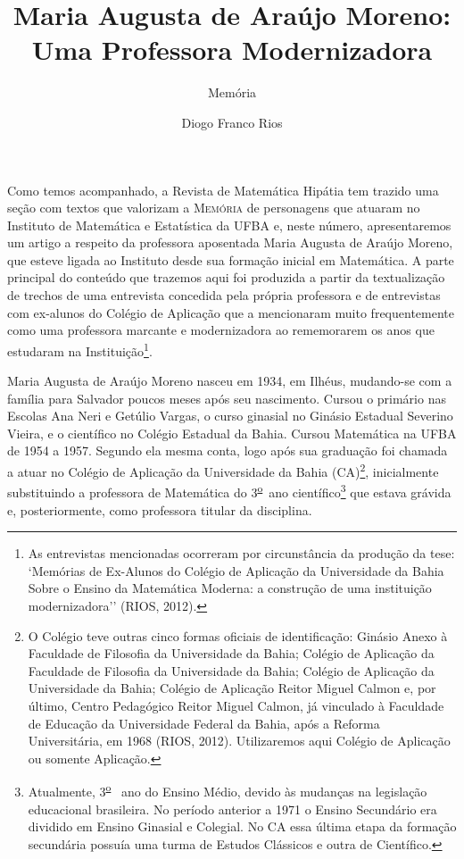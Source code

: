 \documentclass{hipatia}
\title{\fontsize{28}{28}\selectfont Maria Augusta de Araújo Moreno:\\
\fontsize{28}{28}\selectfont Uma Professora Modernizadora}
\subtitle{Memória}
\author{Diogo Franco Rios}
\newcommand{\superou}{\textsuperscript{\underline{o}}~}
\begin{document}
\setcounter{page}{\memoriapage}
\maketitle


Como temos acompanhado, a Revista de Matemática Hipátia tem trazido uma
seção com textos que valorizam a \textsc{Memória} de personagens que atuaram no
Instituto de Matemática e Estatística da UFBA e, neste número,
apresentaremos um artigo a respeito da professora aposentada Maria
Augusta de Araújo Moreno, que esteve ligada ao Instituto desde sua
formação inicial em Matemática. A parte principal do conteúdo que
trazemos aqui foi produzida a partir da textualização de trechos de uma
entrevista concedida pela própria professora e de entrevistas com
ex-alunos do Colégio de Aplicação que a mencionaram muito frequentemente
como uma professora marcante e modernizadora ao rememorarem os anos que
estudaram na Instituição\footnote{As entrevistas mencionadas ocorreram
  por circunstância da produção da tese: `Memórias de Ex-Alunos do
  Colégio de Aplicação da Universidade da Bahia Sobre o Ensino da
  Matemática Moderna: a construção de uma instituição modernizadora''
  (RIOS, 2012).}.


Maria Augusta de Araújo Moreno nasceu em 1934, em Ilhéus, mudando-se com
a família para Salvador poucos meses após seu nascimento. Cursou o
primário nas Escolas Ana Neri e Getúlio Vargas, o curso ginasial no
Ginásio Estadual Severino Vieira, e o científico no Colégio Estadual da
Bahia. Cursou Matemática na UFBA de 1954 a 1957. Segundo ela mesma
conta, logo após sua graduação foi chamada a atuar no Colégio de
Aplicação da Universidade da Bahia (CA)\footnote{O Colégio teve outras
  cinco formas oficiais de identificação: Ginásio Anexo à Faculdade de
  Filosofia da Universidade da Bahia; Colégio de Aplicação da Faculdade
  de Filosofia da Universidade da Bahia; Colégio de Aplicação da
  Universidade da Bahia; Colégio de Aplicação Reitor Miguel Calmon e,
  por último, Centro Pedagógico Reitor Miguel Calmon, já vinculado à
  Faculdade de Educação da Universidade Federal da Bahia, após a Reforma
  Universitária, em 1968 (RIOS, 2012). Utilizaremos aqui Colégio de
  Aplicação ou somente Aplicação.}, inicialmente substituindo a
professora de Matemática do 3\superou  ano científico\footnote{Atualmente, 3\superou 
  ano do Ensino Médio, devido às mudanças na legislação educacional
  brasileira. No período anterior a 1971 o Ensino Secundário era
  dividido em Ensino Ginasial e Colegial. No CA essa última etapa da
  formação secundária possuía uma turma de Estudos Clássicos e outra de
  Científico.} que estava grávida e, posteriormente, como professora
titular da disciplina.
\end{document}
